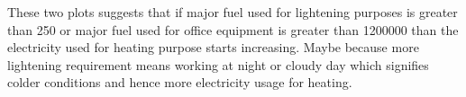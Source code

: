 \documentclass[letterpaper,12pt]{article}
\begin{document}
\begin{figure}[H]%
    \centering
    \qquad
    \label{fig:example}%
\end{figure}

These two plots suggests that if major fuel used for lightening purposes is greater than 250 or major fuel used for office equipment is greater than 1200000 than the electricity used for heating purpose starts increasing. Maybe because more lightening requirement means working at night or cloudy day which signifies colder conditions and hence more electricity usage for heating.

\begin{figure}[H]%
    \centering
    \qquad
    \label{fig:example}%
\end{figure}
\end{document}
